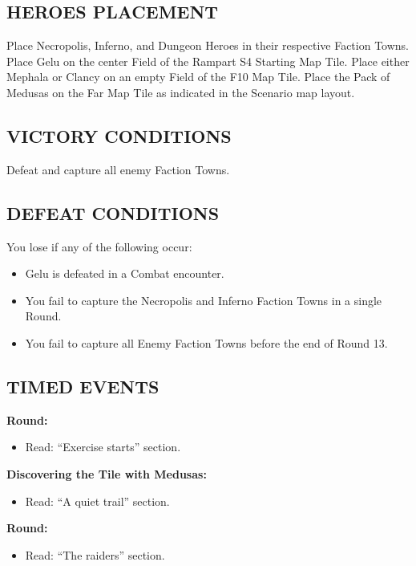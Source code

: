 \begin{multicols*}{2}
\subsection*{\MakeUppercase{Heroes Placement}}

Place Necropolis, Inferno, and Dungeon Heroes in their respective Faction Towns.
Place Gelu on the center Field of the Rampart S4 Starting Map Tile.
Place either Mephala or Clancy on an empty Field of the F10 Map Tile.
Place the Pack of Medusas on the Far Map Tile as indicated in the Scenario map layout.

\subsection*{\MakeUppercase{Victory Conditions}}

Defeat and capture all enemy Faction Towns.

\subsection*{\MakeUppercase{Defeat Conditions}}

You lose if any of the following occur:
\begin{itemize}
  \item Gelu is defeated in a Combat encounter.
  \item You fail to capture the Necropolis and Inferno Faction Towns in a single Round.
  \item You fail to capture all Enemy Faction Towns before the end of Round 13.
\end{itemize}
\subsection*{\MakeUppercase{Timed Events}}

\textbf{ Round:}
\begin{itemize}
  \item Read: ``Exercise starts'' section.
  \end{itemize}

\textbf{Discovering the Tile with Medusas:}
\begin{itemize}
  \item Read: ``A quiet trail'' section.
\end{itemize}

\textbf{ Round:}
\begin{itemize}
  \item Read: ``The raiders'' section.
\end{itemize}


\end{multicols*}
